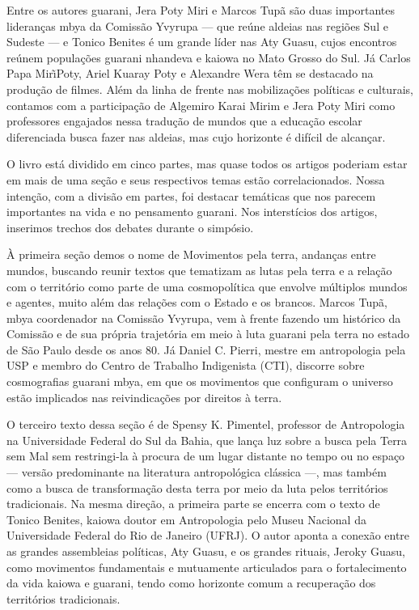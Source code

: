 \documentclass{article}
\begin{document}
Entre os autores guarani, Jera Poty Miri e Marcos Tup\~a s\~ao duas
importantes lideran\c{c}as mbya da Comiss\~ao Yvyrupa --- que re\'une
aldeias nas regi\~oes Sul e Sudeste --- e Tonico Benites \'e um grande
l\'ider nas Aty Guasu, cujos encontros re\'unem popula\c{c}\~oes
guarani nhandeva e kaiowa no Mato Grosso do Sul. J\'a Carlos Papa
Mir\~\i Poty, Ariel Kuaray Poty e Alexandre Wera t\^em se destacado na
produ\c{c}\~ao de filmes. Al\'em da linha de frente nas
mobiliza\c{c}\~oes pol\'iticas e culturais, contamos com a
participa\c{c}\~ao de Algemiro Karai Mirim e Jera Poty Miri como
professores engajados nessa tradu\c{c}\~ao de mundos que a
educa\c{c}\~ao escolar diferenciada busca fazer nas aldeias, mas cujo
horizonte \'e dif\'icil de alcan\c{c}ar.

O livro est\'a dividido em cinco partes, mas quase todos os artigos
poderiam estar em mais de uma se\c{c}\~ao e seus respectivos temas
est\~ao correlacionados. Nossa inten\c{c}\~ao, com a divis\~ao em
partes, foi destacar tem\'aticas que nos parecem importantes na vida e
no pensamento guarani. Nos interst\'icios dos artigos, inserimos
trechos dos debates durante o simp\'osio.

\`A primeira se\c{c}\~ao demos o nome de Movimentos pela terra,
andan\c{c}as entre mundos, buscando reunir textos que tematizam as
lutas pela terra e a rela\c{c}\~ao com o territ\'orio como parte de uma
cosmopol\'itica que envolve m\'ultiplos mundos e agentes, muito al\'em
das rela\c{c}\~oes com o Estado e os brancos. Marcos Tup\~a, mbya
coordenador na Comiss\~ao Yvyrupa, vem \`a frente fazendo um
hist\'orico da Comiss\~ao e de sua pr\'opria trajet\'oria em meio \`a
luta guarani pela terra no estado de S\~ao Paulo desde os anos 80. J\'a
Daniel C. Pierri, mestre em antropologia pela USP e membro do Centro de
Trabalho Indigenista (CTI), discorre sobre cosmografias guarani mbya,
em que os movimentos que configuram o universo est\~ao implicados nas
reivindica\c{c}\~oes por direitos \`a terra.

O terceiro texto dessa se\c{c}\~ao \'e de Spensy K. Pimentel, professor
de Antropologia na Universidade Federal do Sul da Bahia, que lan\c{c}a
luz sobre a busca pela Terra sem Mal sem restringi-la \`a procura de um
lugar distante no tempo ou no espa\c{c}o --- vers\~ao predominante na
literatura antropol\'ogica cl\'assica ---, mas tamb\'em como a busca de
transforma\c{c}\~ao desta terra por meio da luta pelos territ\'orios
tradicionais. Na mesma dire\c{c}\~ao, a primeira parte se encerra com o
texto de Tonico Benites, kaiowa doutor em Antropologia pelo Museu
Nacional da Universidade Federal do Rio de Janeiro (UFRJ). O autor
aponta a conex\~ao entre as grandes assembleias pol\'iticas, Aty Guasu,
e os grandes rituais, Jeroky Guasu, como movimentos fundamentais e
mutuamente articulados para o fortalecimento da vida kaiowa e guarani,
tendo como horizonte comum a recupera\c{c}\~ao dos territ\'orios
tradicionais.
\end{document}
